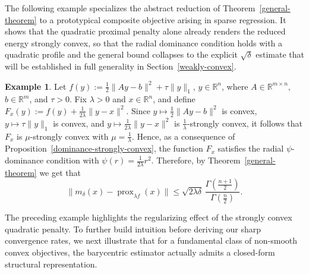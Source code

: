 \documentclass[11pt]{article}
\newcommand{\1}{\mathds{1}}
\theoremstyle{definition}
\theoremstyle{remark}
\theoremstyle{definition}
\newtheorem{example}{Example}[section]
\begin{document}
The following example specializes the abstract reduction of Theorem~\ref{general-theorem} to a prototypical composite objective arising in sparse regression. It shows that the quadratic proximal penalty alone already renders the reduced energy strongly convex, so that the radial dominance condition holds with a quadratic profile and the general bound collapses to the explicit $\sqrt{\delta}$ estimate that will be established in full generality in Section~\ref{weakly-convex}.
\begin{example}
Let \(f(y):=\frac12\|Ay-b\|^2+\tau\|y\|_1\), \(y\in\mathbb R^n\), where
\(A\in\mathbb R^{m\times n}\), \(b\in\mathbb R^m\), and \(\tau>0\). Fix
\(\lambda>0\) and \(x\in\mathbb R^n\), and define
\(F_x(y):=f(y)+\frac{1}{2\lambda}\|y-x\|^2\). Since
\(y\mapsto \frac12\|Ay-b\|^2\) is convex, \(y\mapsto \tau\|y\|_1\) is convex,
and \(y\mapsto \frac{1}{2\lambda}\|y-x\|^2\) is \(\frac1\lambda\)-strongly
convex, it follows that \(F_x\) is \(\mu\)-strongly convex with
\(\mu=\frac1\lambda\). Hence, as a consequence of Proposition~\ref{dominance-strongly-convex}, the function $F_x$ satisfies the radial $\psi$-dominance condition with  $\psi(r) = \frac{1}{2\lambda } r^2$. Therefore, by  
Theorem~\ref{general-theorem} we get that
\[
\|m_\delta(x)-\operatorname{prox}_{\lambda f}(x)\|
\le
\sqrt{2\lambda\delta}\,
\frac{\Gamma\!\left(\frac{n+1}{2}\right)}
{\Gamma\!\left(\frac{n}{2}\right)}.
\]
\end{example}
The preceding example highlights the regularizing effect of the strongly convex quadratic penalty. To further build intuition before deriving our sharp convergence rates, we next illustrate that for a fundamental class of non-smooth convex objectives, the barycentric estimator actually admits a closed-form structural representation.
\end{document}
